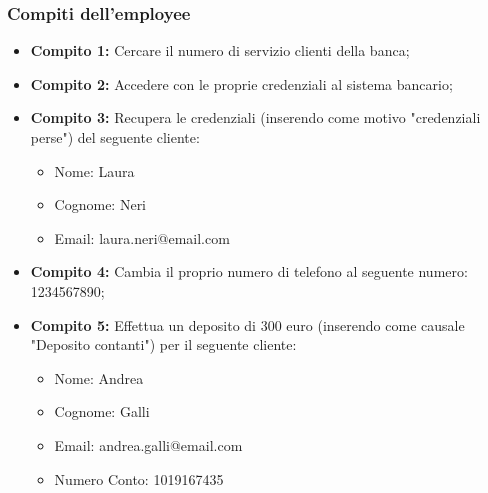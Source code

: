\subsubsection{Compiti dell'employee}
\begin{itemize}
	\item \textbf{Compito 1:} Cercare il numero di servizio clienti della banca;
	\item \textbf{Compito 2:} Accedere con le proprie credenziali al sistema bancario;
	\item \textbf{Compito 3:} Recupera le credenziali (inserendo come motivo "credenziali perse") del seguente cliente:
		\begin{itemize}
			\item Nome: Laura
			\item Cognome: Neri
			\item Email: laura.neri@email.com 
		\end{itemize}
	\item \textbf{Compito 4:} Cambia il proprio numero di telefono al seguente numero: 1234567890;
	\item \textbf{Compito 5:} Effettua un deposito di 300 euro (inserendo come causale "Deposito contanti") per il seguente cliente:
		\begin{itemize}
			\item Nome: Andrea
			\item Cognome: Galli
			\item Email: andrea.galli@email.com
			\item Numero Conto: 1019167435
		\end{itemize}
\end{itemize}

